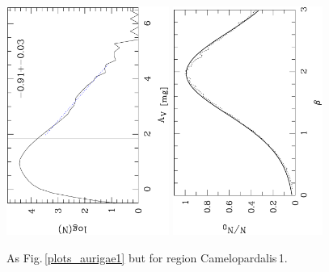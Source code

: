 \documentclass[useAMS,usenatbib]{mn2e}
\begin{document}
\begin{appendix}
\begin{figure}
\includegraphics[height=7.5cm,angle=-90]{av_dist_chameleopardalis1.ps}
\hfill
\includegraphics[height=7.5cm,angle=-90]{histo_chameleopardalis1.ps}
\caption{\label{plots_chameleopardalis1} As Fig.\,\ref{plots_aurigae1} but for
region Camelopardalis\,1.}   
\end{figure}


\end{appendix}
\end{document}

